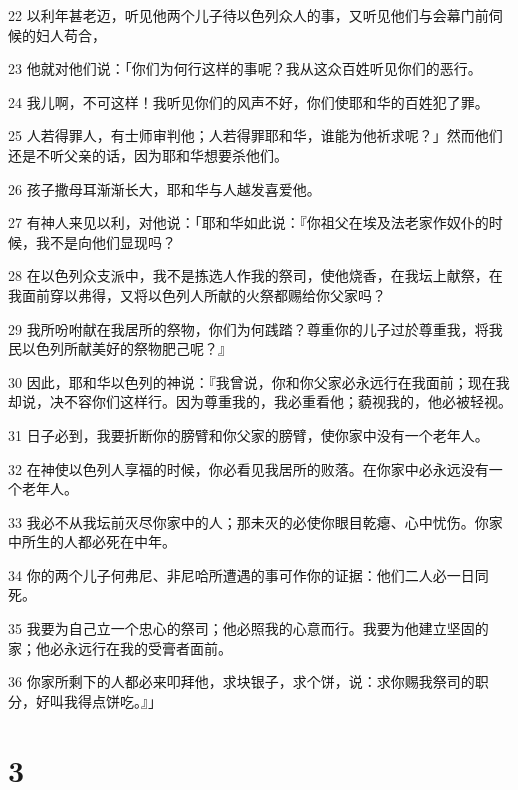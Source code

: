 \par 22 以利年甚老迈，听见他两个儿子待以色列众人的事，又听见他们与会幕门前伺候的妇人苟合，
\par 23 他就对他们说：「你们为何行这样的事呢？我从这众百姓听见你们的恶行。
\par 24 我儿啊，不可这样！我听见你们的风声不好，你们使耶和华的百姓犯了罪。
\par 25 人若得罪人，有士师审判他；人若得罪耶和华，谁能为他祈求呢？」然而他们还是不听父亲的话，因为耶和华想要杀他们。
\par 26 孩子撒母耳渐渐长大，耶和华与人越发喜爱他。
\par 27 有神人来见以利，对他说：「耶和华如此说：『你祖父在埃及法老家作奴仆的时候，我不是向他们显现吗？
\par 28 在以色列众支派中，我不是拣选人作我的祭司，使他烧香，在我坛上献祭，在我面前穿以弗得，又将以色列人所献的火祭都赐给你父家吗？
\par 29 我所吩咐献在我居所的祭物，你们为何践踏？尊重你的儿子过於尊重我，将我民以色列所献美好的祭物肥己呢？』
\par 30 因此，耶和华以色列的神说：『我曾说，你和你父家必永远行在我面前；现在我却说，决不容你们这样行。因为尊重我的，我必重看他；藐视我的，他必被轻视。
\par 31 日子必到，我要折断你的膀臂和你父家的膀臂，使你家中没有一个老年人。
\par 32 在神使以色列人享福的时候，你必看见我居所的败落。在你家中必永远没有一个老年人。
\par 33 我必不从我坛前灭尽你家中的人；那未灭的必使你眼目乾瘪、心中忧伤。你家中所生的人都必死在中年。
\par 34 你的两个儿子何弗尼、非尼哈所遭遇的事可作你的证据：他们二人必一日同死。
\par 35 我要为自己立一个忠心的祭司；他必照我的心意而行。我要为他建立坚固的家；他必永远行在我的受膏者面前。
\par 36 你家所剩下的人都必来叩拜他，求块银子，求个饼，说：求你赐我祭司的职分，好叫我得点饼吃。』」

\chapter{3}

